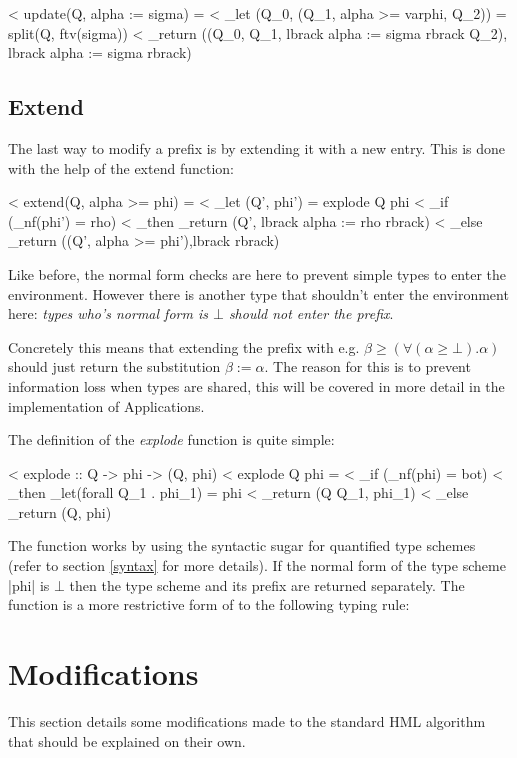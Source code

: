 < update(Q, alpha := sigma) =
<    _let (Q_0, (Q_1, alpha >= varphi, Q_2)) = split(Q, ftv(sigma))
<    _return ((Q_0, Q_1, lbrack alpha := sigma rbrack Q_2), lbrack alpha := sigma rbrack)

\subsection{Extend}
The last way to modify a prefix is by extending it with a new entry. This is done with the help of the extend function:

< extend(Q, alpha >= phi) = 
<    _let (Q', phi') = explode Q phi
<            _if  (_nf(phi') = rho)
<                 _then _return (Q', lbrack alpha := rho rbrack)
<                 _else _return ((Q', alpha >= phi'),lbrack rbrack)

Like before, the normal form checks are here to prevent simple types to enter the environment. However there is another type that shouldn't enter the environment here: \emph{types who's normal form is $\bot$ should not enter the prefix}. 

Concretely this means that extending the prefix with e.g. $\beta \geq (\forall(\alpha \geq \bot).\alpha)$ should just return the substitution $\beta := \alpha$. The reason for this is to prevent information loss when types are shared, this will be covered in more detail in the implementation of Applications.

The definition of the \emph{explode} function is quite simple:

< explode :: Q -> phi -> (Q, phi)
< explode Q phi =
<    _if  (_nf(phi) = bot)
<         _then  _let(forall Q_1 . phi_1) = phi
<                _return (Q Q_1, phi_1)
<         _else _return (Q, phi)

The function works by using the syntactic sugar for quantified type schemes (refer to section \ref{syntax} for more details). If the normal form of the type scheme |phi| is $\bot$ then the type scheme and its prefix are returned separately. The function is a more restrictive form of to the following typing rule:

\begin{prooftree}
\end{prooftree}

\section{Modifications}
This section details some modifications made to the standard HML algorithm that should be explained on their own.
